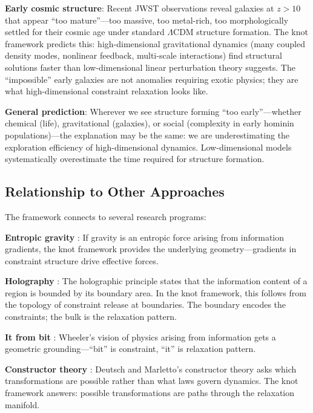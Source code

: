 \documentclass[11pt,a4paper]{article}
\begin{document}
\begin{enumerate}
    \textbf{Early cosmic structure}: Recent JWST observations reveal galaxies at $z > 10$ that appear ``too mature''---too massive, too metal-rich, too morphologically settled for their cosmic age under standard $\Lambda$CDM structure formation. The knot framework predicts this: high-dimensional gravitational dynamics (many coupled density modes, nonlinear feedback, multi-scale interactions) find structural solutions faster than low-dimensional linear perturbation theory suggests. The ``impossible'' early galaxies are not anomalies requiring exotic physics; they are what high-dimensional constraint relaxation looks like.

    \textbf{General prediction}: Wherever we see structure forming ``too early''---whether chemical (life), gravitational (galaxies), or social (complexity in early hominin populations)---the explanation may be the same: we are underestimating the exploration efficiency of high-dimensional dynamics. Low-dimensional models systematically overestimate the time required for structure formation.
\end{enumerate}

\subsection{Relationship to Other Approaches}

The framework connects to several research programs:

\textbf{Entropic gravity} \cite{verlinde2011}: If gravity is an entropic force arising from information gradients, the knot framework provides the underlying geometry---gradients in constraint structure drive effective forces.

\textbf{Holography} \cite{susskind1995, bousso2002}: The holographic principle states that the information content of a region is bounded by its boundary area. In the knot framework, this follows from the topology of constraint release at boundaries. The boundary encodes the constraints; the bulk is the relaxation pattern.

\textbf{It from bit} \cite{wheeler1990}: Wheeler's vision of physics arising from information gets a geometric grounding---``bit'' is constraint, ``it'' is relaxation pattern.

\textbf{Constructor theory} \cite{deutsch2015}: Deutsch and Marletto's constructor theory asks which transformations are possible rather than what laws govern dynamics. The knot framework answers: possible transformations are paths through the relaxation manifold.
\end{document}
